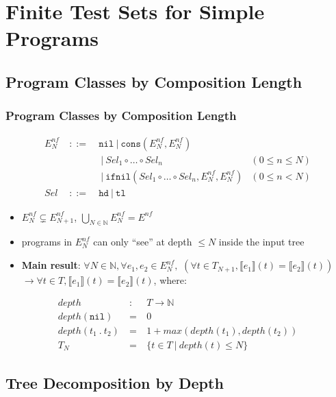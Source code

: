 \documentclass{beamer}
\begin{document}
\section{Finite Test Sets for Simple Programs}

\subsection{Program Classes by Composition Length}

\begin{frame}
  \frametitle{Program Classes by Composition Length}
  \[\begin{array}{lclr}
  E^{nf}_N & ~::=~ & \texttt{nil} ~|~ \texttt{cons}(E^{nf}_N, E^{nf}_N) & \\
         &       & ~|~ \mathit{Sel}_1 \circ \ldots \circ \mathit{Sel}_n & (0 \le n \le N) \\
         &       & ~|~ \texttt{ifnil}(\mathit{Sel}_1 \circ \ldots \circ \mathit{Sel}_n, E^{nf}_N, E^{nf}_N) & (0 \le n < N) \\
  \mathit{Sel} & ~::=~ & \texttt{hd} ~|~ \texttt{tl} & 
  \end{array}
  \]
  \pause
  \begin{itemize}
    \item $E^{nf}_N \varsubsetneq E^{nf}_{N+1}$, $\bigcup_{N \in \mathbb{N}} E^{nf}_N = E^{nf}$
  \pause
    \item programs in $E^{nf}_N$ can only ``see'' at depth $\le N$ inside the input tree  
  \pause
    \item \textbf{Main result}:
    $\forall N \in \mathbb{N}, \forall e_1, e_2 \in E^{nf}_N,$ 
    $(\forall t \in T_{N+1}, \llbracket e_1 \rrbracket (t) = \llbracket e_2 \rrbracket (t))$
    $\rightarrow \forall t \in T, \llbracket e_1 \rrbracket (t) = \llbracket e_2 \rrbracket (t)$, where:
  \end{itemize}
    \[\begin{array}{lcl}
    \mathit{depth} & ~:~ & T \rightarrow \mathbb{N} \\
    \mathit{depth}(\texttt{nil}) & ~=~ & 0 \\
    \mathit{depth}(t_1 ~.~ t_2) & ~=~ & 1 + \mathit{max}(\mathit{depth}(t_1), \mathit{depth}(t_2)) \\
    T_{N} & ~=~ & \{t \in T ~|~ \mathit{depth}(t) \le N \} 
    \end{array}
    \]
\end{frame}

\subsection{Tree Decomposition by Depth}
\end{document}
